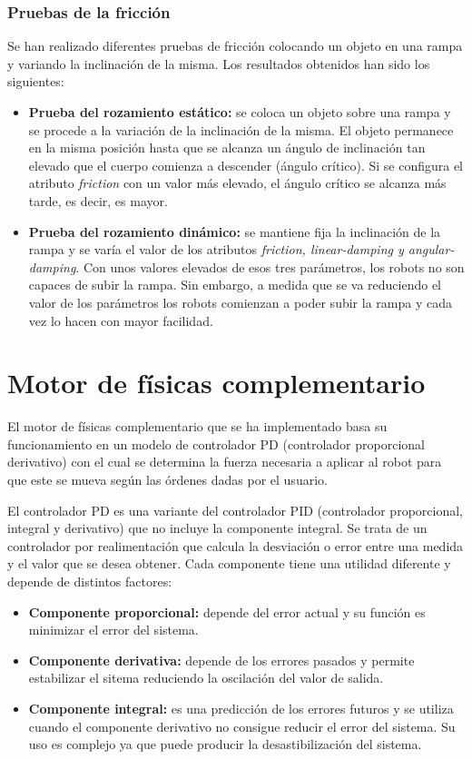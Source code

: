 \subsubsection{Pruebas de la fricción}
Se han realizado diferentes pruebas de fricción colocando un objeto en una rampa y variando la inclinación de la misma. Los resultados obtenidos han sido los siguientes:
\begin{itemize}
    \item \textbf{Prueba del rozamiento estático: } se coloca un objeto sobre una rampa y se procede a la variación de la inclinación de la misma. El objeto permanece en la misma posición hasta que se alcanza un ángulo de inclinación tan elevado que el cuerpo comienza a descender (ángulo crítico). Si se configura el atributo \textit{friction} con un valor más elevado, el ángulo crítico se alcanza más tarde, es decir, es mayor.
    \item \textbf{Prueba del rozamiento dinámico: } se mantiene fija la inclinación de la rampa y se varía el valor de los atributos \textit{friction, linear-damping y angular-damping}. Con unos valores elevados de esos tres parámetros, los robots no son capaces de subir la rampa. Sin embargo, a medida que se va reduciendo el valor de los parámetros los robots comienzan a poder subir la rampa y cada vez lo hacen con mayor facilidad.
\end{itemize}

\section{Motor de físicas complementario}
El motor de físicas complementario que se ha implementado basa su funcionamiento en un modelo de controlador PD (controlador proporcional derivativo) con el cual se determina la fuerza necesaria a aplicar al robot para que este se mueva según las órdenes dadas por el usuario.\newline

El controlador PD es una variante del controlador PID (controlador proporcional, integral y derivativo) que no incluye la componente integral. Se trata de un controlador por realimentación que calcula la desviación o error entre una medida y el valor que se desea obtener. Cada componente tiene una utilidad diferente y depende de distintos factores:
\begin{itemize}
    \item \textbf{Componente proporcional: }depende del error actual y su función es minimizar el error del sistema.
    \item \textbf{Componente derivativa: }depende de los errores pasados y permite estabilizar el sitema reduciendo la oscilación del valor de salida.
    \item \textbf{Componente integral: }es una predicción de los errores futuros y se utiliza cuando el componente derivativo no consigue reducir el error del sistema. Su uso es complejo ya que puede producir la desastibilización del sistema.
\end{itemize}

